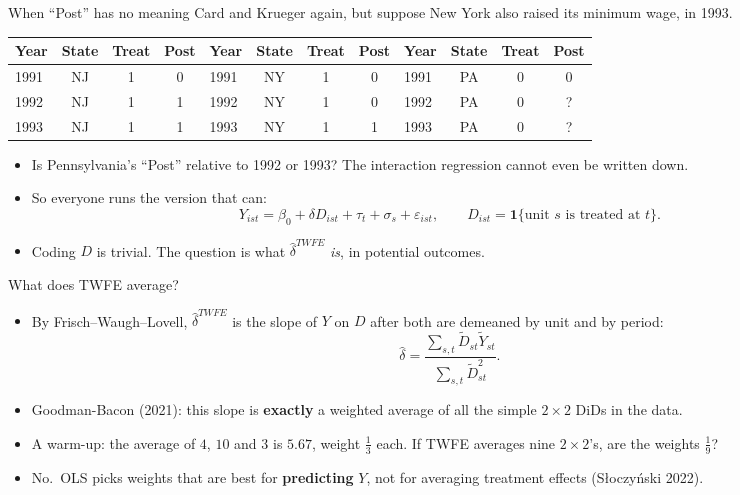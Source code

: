 \documentclass[
  11pt,
  ignorenonframetext,
  aspectratio=169,
]{beamer}
\providecommand{\tightlist}{%
  \setlength{\itemsep}{0pt}\setlength{\parskip}{0pt}}
\begin{document}
\begin{frame}{When ``Post'' has no meaning}
\protect{}\label{when-post-has-no-meaning}
Card and Krueger again, but suppose New York also raised its minimum
wage, in 1993.

\begin{center}\scriptsize
\begin{tabular}{lccc|lccc|lccc}
\toprule
Year & State & Treat & Post & Year & State & Treat & Post & Year & State & Treat & Post \\
\midrule
1991 & NJ & 1 & 0 & 1991 & NY & 1 & 0 & 1991 & PA & 0 & 0 \\
1992 & NJ & 1 & 1 & 1992 & NY & 1 & 0 & 1992 & PA & 0 & ? \\
1993 & NJ & 1 & 1 & 1993 & NY & 1 & 1 & 1993 & PA & 0 & ? \\
\bottomrule
\end{tabular}
\end{center}

\begin{itemize}
\tightlist
\item
  Is Pennsylvania's ``Post'' relative to 1992 or 1993? The interaction
  regression cannot even be written down.
\item
  So everyone runs the version that can: \[
  Y_{ist} = \beta_0 + \delta D_{ist} + \tau_t + \sigma_s + \varepsilon_{ist}, \qquad D_{ist} = \mathbf{1}\{\text{unit } s \text{ is treated at } t\}.
  \]
\item
  Coding \(D\) is trivial. The question is what \(\hat\delta^{TWFE}\)
  \emph{is}, in potential outcomes.
\end{itemize}
\end{frame}

\begin{frame}{What does TWFE average?}
\protect{}\label{what-does-twfe-average}
\begin{itemize}
\tightlist
\item
  By Frisch--Waugh--Lovell, \(\hat\delta^{TWFE}\) is the slope of \(Y\)
  on \(D\) after both are demeaned by unit and by period: \[
  \hat\delta = \frac{\sum_{s,t} \tilde D_{st}\tilde Y_{st}}{\sum_{s,t} \tilde D_{st}^2}.
  \]
\item
  Goodman-Bacon (2021): this slope is \textbf{exactly} a weighted
  average of all the simple \(2 \times 2\) DiDs in the data.
\item
  A warm-up: the average of \(4\), \(10\) and \(3\) is \(5.67\), weight
  \(\tfrac13\) each. If TWFE averages nine \(2 \times 2\)'s, are the
  weights \(\tfrac19\)?
\item
  No.~OLS picks weights that are best for \textbf{predicting} \(Y\), not
  for averaging treatment effects (Słoczyński 2022).
\end{itemize}
\end{frame}
\end{document}
